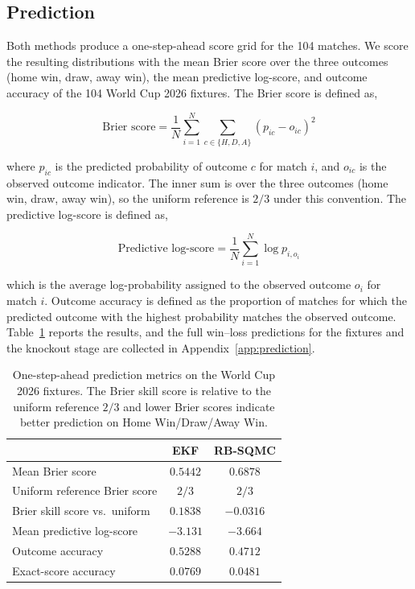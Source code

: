 \subsection{Prediction}

Both methods produce a one-step-ahead score grid for the 104 matches. We score the resulting distributions with the mean Brier score over the three outcomes (home win, draw, away win), the mean predictive log-score, and outcome accuracy of the 104 World Cup 2026 fixtures. The Brier score is defined as,

\begin{equation}
    \text{Brier score} = \frac{1}{N} \sum_{i=1}^N \sum_{c\in\{H,D,A\}} (p_{ic} - o_{ic})^2 \nonumber
\end{equation}

where $p_{ic}$ is the predicted probability of outcome $c$ for match $i$, and $o_{ic}$ is the observed outcome indicator. The inner sum is over the three outcomes (home win, draw, away win), so the uniform reference is $2/3$ under this convention. The predictive log-score is defined as,

\begin{equation}
    \text{Predictive log-score} = \frac{1}{N} \sum_{i=1}^N \log p_{i,o_i} \nonumber
\end{equation}

which is the average log-probability assigned to the observed outcome $o_i$ for match $i$. Outcome accuracy is defined as the proportion of matches for which the predicted outcome with the highest probability matches the observed outcome. Table~\ref{tab:prediction} reports the results, and the full win--loss predictions for the fixtures and the knockout stage are collected in Appendix~\ref{app:prediction}.
\begin{table}[H]
\centering
\begin{tabular}{lcc}
\toprule
 & EKF & RB-SQMC \\
\midrule
Mean Brier score & $0.5442$ & $0.6878$ \\
Uniform reference Brier score & $2/3$ & $2/3$ \\
Brier skill score vs.\ uniform & $0.1838$ & $-0.0316$ \\
Mean predictive log-score & $-3.131$ & $-3.664$ \\
Outcome accuracy & $0.5288$ & $0.4712$ \\
Exact-score accuracy & $0.0769$ & $0.0481$ \\
\bottomrule
\end{tabular}
\caption{One-step-ahead prediction metrics on the World Cup 2026 fixtures. The Brier skill score is relative to the uniform reference $2/3$ and lower Brier scores indicate better prediction on Home Win/Draw/Away Win.}
\label{tab:prediction}
\end{table}

